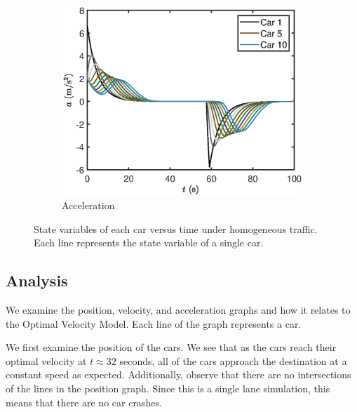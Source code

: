\documentclass[12pt]{article}
\begin{document}
\begin{figure}[H]
        \begin{subfigure}[H]{0.49\textwidth}
          \includegraphics[width=\linewidth]{HomogeneousTraffic3.eps}
          \centering
          \caption{Acceleration}
        \end{subfigure}
        \caption{State variables of each car versus time under homogeneous traffic. Each line represents the state variable of a single car.} \label{homogeneous_results}
      \end{figure}

      
      \subsection{Analysis}\label{sec:homogeneous_analysis}
      We examine the position, velocity, and acceleration graphs and how it relates to the Optimal Velocity Model. Each line of the graph represents a car. 
      
      We first examine the position of the cars. We see that as the cars reach their optimal velocity at $t \approx 32$ seconds, all of the cars approach the destination at a constant speed as expected. Additionally, observe that there are no intersections of the lines in the position graph. Since this is a single lane simulation, this means that there are no car crashes. 
\end{document}
